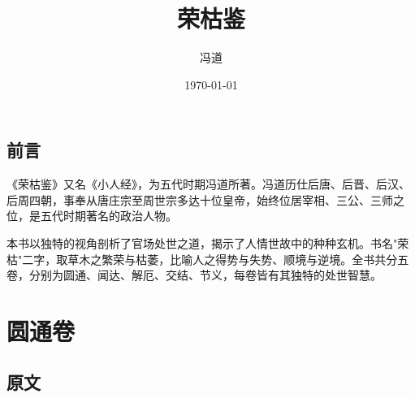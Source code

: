 \documentclass[12pt,UTF8]{ctexbook}
\title{\heiti\zihao{0} 荣枯鉴}
\author{冯道}
\date{\today}
\begin{document}
\maketitle
\tableofcontents

\frontmatter
\chapter{前言}

《荣枯鉴》又名《小人经》，为五代时期冯道所著。冯道历仕后唐、后晋、后汉、后周四朝，事奉从唐庄宗至周世宗多达十位皇帝，始终位居宰相、三公、三师之位，是五代时期著名的政治人物。

本书以独特的视角剖析了官场处世之道，揭示了人情世故中的种种玄机。书名"荣枯"二字，取草木之繁荣与枯萎，比喻人之得势与失势、顺境与逆境。全书共分五卷，分别为圆通、闻达、解厄、交结、节义，每卷皆有其独特的处世智慧。

\mainmatter

\part{圆通卷}

\chapter{原文}
\end{document}
